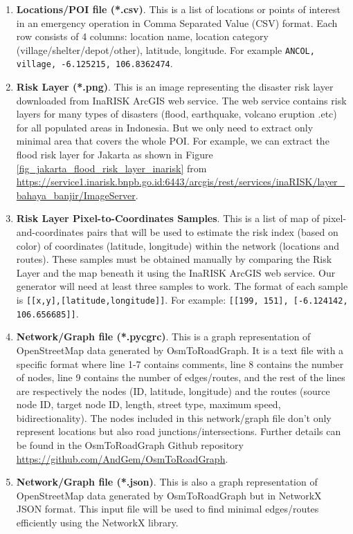 \documentclass[conference]{IEEEtran}
\begin{document}
\begin{enumerate}

\item \textbf{Locations/POI file (*.csv)}. This is a list of locations or points of interest in an emergency operation in Comma Separated Value (CSV) format. Each row consists of 4 columns: location name, location category (village/shelter/depot/other), latitude, longitude. For example \texttt{ANCOL, village, -6.125215, 106.8362474}.

\item \textbf{Risk Layer (*.png)}. This is an image representing the disaster risk layer downloaded from InaRISK\cite{Bnpb2016Inarisk} ArcGIS web service. The web service contains risk layers for many types of disasters (flood, earthquake, volcano eruption .etc) for all populated areas in Indonesia. But we only need to extract only minimal area that covers the whole POI. For example, we can extract the flood risk layer for Jakarta as shown in Figure \ref{fig_jakarta_flood_risk_layer_inarisk} from \url{https://service1.inarisk.bnpb.go.id:6443/arcgis/rest/services/inaRISK/layer_bahaya_banjir/ImageServer}.

\item \textbf{Risk Layer Pixel-to-Coordinates Samples}. This is a list of map of pixel-and-coordinates pairs that will be used to estimate the risk index (based on color) of coordinates (latitude, longitude) within the network (locations and routes). These samples must be obtained manually by comparing the Risk Layer and the map beneath it using the InaRISK ArcGIS web service. Our generator will need at least three samples to work. The format of each sample is \texttt{[[x,y],[latitude,longitude]]}. For example: \texttt{[[199, 151], [-6.124142, 106.656685]]}.

\item \textbf{Network/Graph file (*.pycgrc)}. This is a graph representation of OpenStreetMap data generated by OsmToRoadGraph\cite{Gemsa2017OsmToRoadGraph}. It is a text file with a specific format where line 1-7 contains comments, line 8 contains the number of nodes, line 9 contains the number of edges/routes, and the rest of the lines are respectively the nodes (ID, latitude, longitude) and the routes (source node ID, target node ID, length, street type, maximum speed, bidirectionality). The nodes included in this network/graph file don't only represent locations but also road junctions/intersections. Further details can be found in the OsmToRoadGraph Github repository \url{https://github.com/AndGem/OsmToRoadGraph}.

\item \textbf{Network/Graph file (*.json)}. This is also a graph representation of OpenStreetMap data generated by OsmToRoadGraph\cite{Gemsa2017OsmToRoadGraph} but in NetworkX\cite{SciPyProceedings_11} JSON format. This input file will be used to find minimal edges/routes efficiently using the NetworkX library.

\end{enumerate}
\end{document}

